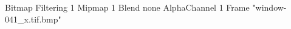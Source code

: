 {Bitmap
	{Filtering 1}
	{Mipmap 1}
	{Blend none}
	{AlphaChannel 1}
	{Frame "window-041_x.tif.bmp"}
}
